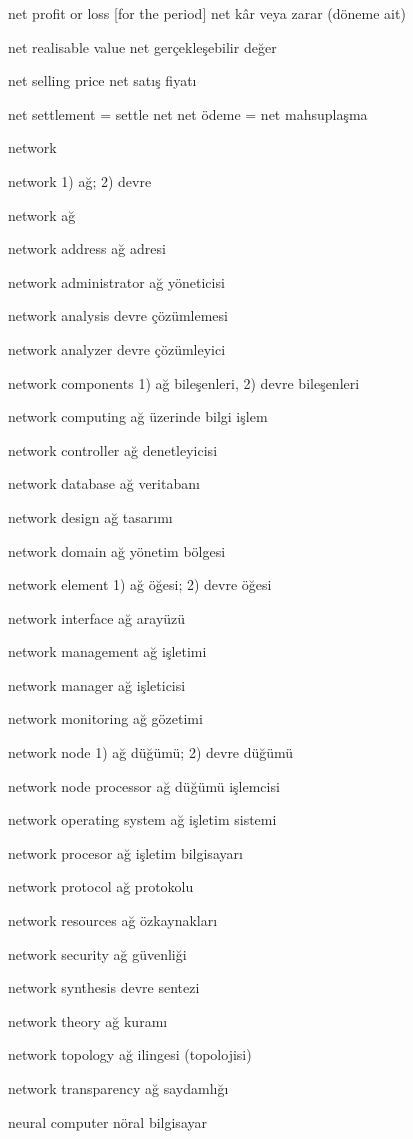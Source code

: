 \documentclass[12pt,fleqn]{article}\usepackage{../../common}
\begin{document}
net profit or loss [for the period] net kâr veya zarar (döneme ait)

net realisable value net gerçekleşebilir değer

net selling price net satış fiyatı

net settlement = settle net net ödeme = net mahsuplaşma

network

network 1) ağ; 2) devre

network ağ

network address ağ adresi

network administrator ağ yöneticisi

network analysis devre çözümlemesi

network analyzer devre çözümleyici

network components 1) ağ bileşenleri, 2) devre bileşenleri

network computing ağ üzerinde bilgi işlem

network controller ağ denetleyicisi

network database ağ veritabanı

network design ağ tasarımı

network domain ağ yönetim bölgesi

network element 1) ağ öğesi; 2) devre öğesi

network interface ağ arayüzü

network management ağ işletimi

network manager ağ işleticisi

network monitoring ağ gözetimi

network node 1) ağ düğümü; 2) devre düğümü

network node processor ağ düğümü işlemcisi

network operating system ağ işletim sistemi

network procesor ağ işletim bilgisayarı

network protocol ağ protokolu

network resources ağ özkaynakları

network security ağ güvenliği

network synthesis devre sentezi

network theory ağ kuramı

network topology ağ ilingesi (topolojisi)

network transparency ağ saydamlığı

neural computer nöral bilgisayar
\end{document}
